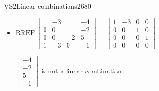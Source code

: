 \begin{exercise}{VS2}{Linear combinations}{2680}
\begin{exerciseAnswer}
\begin{itemize}
 

 \(\left[\begin{array}{c}
-5 \\
-3 \\
6 \\
-2
\end{array}\right]\) is a linear combination, for example: \(
-2 \left[\begin{array}{c}
1 \\
0 \\
0 \\
1
\end{array}\right] + -3 \left[\begin{array}{c}
1 \\
1 \\
-2 \\
0
\end{array}\right] = \left[\begin{array}{c}
-5 \\
-3 \\
6 \\
-2
\end{array}\right]
                            \) 

 
\item  

 \(
\mathrm{RREF}\, \left[\begin{array}{ccc|c}
1 & -3 & 1 & -4 \\
0 & 0 & 1 & -2 \\
0 & 0 & -2 & 5 \\
1 & -3 & 0 & -1
\end{array}\right] = \left[\begin{array}{ccc|c}
1 & -3 & 0 & 0 \\
0 & 0 & 1 & 0 \\
0 & 0 & 0 & 1 \\
0 & 0 & 0 & 0
\end{array}\right]
                        \) 

 

 \(\left[\begin{array}{c}
-4 \\
-2 \\
5 \\
-1
\end{array}\right]\) is not a linear combination. 

 
\end{itemize}

     \end{exerciseAnswer}
 \end{exercise}


